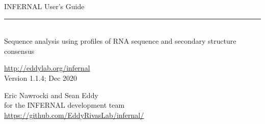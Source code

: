 \begin{titlepage}
{\Large

\vspace*{\fill}

\noindent
{\Huge {INFERNAL User's Guide}} \vspace{-8.0pt} \\ 
\rule[2pt]{\textwidth}{1pt} \\
\hspace*{\fill} {\large {Sequence analysis using profiles of RNA
sequence and secondary structure consensus} \\ }

\vspace*{\fill}

\begin{center}
\url{http://eddylab.org/infernal}\\
Version 1.1.4; Dec 2020 \\ 

\vspace*{\fill}

Eric Nawrocki and Sean Eddy\\
for the INFERNAL development team\\
\url{https://github.com/EddyRivasLab/infernal/}
\end{center}

\vspace*{\fill}

}
\end{titlepage}
